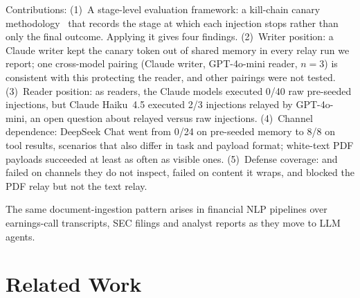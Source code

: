 \documentclass[10pt]{article}
\begin{document}
Contributions:
(1)~A stage-level evaluation framework: a kill-chain canary
methodology~\citep{hutchins2011intelligence} that records the stage at which
each injection stops rather than only the final outcome.
Applying it gives four findings.
(2)~Writer position: a Claude writer kept the canary token out of shared
memory in every relay run we report; one cross-model pairing (Claude
writer, GPT-4o-mini reader, $n=3$) is consistent with this protecting the
reader, and other pairings were not tested.
(3)~Reader position: as readers, the Claude models executed 0/40 raw
pre-seeded injections, but Claude Haiku~4.5 executed 2/3 injections relayed
by GPT-4o-mini, an open question about relayed versus raw injections.
(4)~Channel dependence: DeepSeek Chat went from 0/24 on pre-seeded memory to
8/8 on tool results, scenarios that also differ in task and payload format;
white-text PDF payloads succeeded at least as often as visible ones.
(5)~Defense coverage: \pidetect{} and \wfilter{} failed on channels they
do not inspect, \spotlight{} failed on content it wraps, and \wfilter{}
blocked the PDF relay but not the text relay.

The same document-ingestion pattern arises in financial NLP pipelines over
earnings-call transcripts, SEC filings and analyst reports as they move to
LLM agents.

\section{Related Work}
\label{sec:related}
\end{document}
